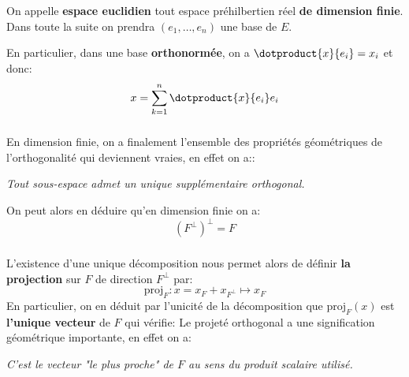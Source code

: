 \chapter*{}
On appelle \textbf{espace euclidien} tout espace préhilbertien réel \textbf{de dimension finie}. Dans toute la suite on prendra \((e_1, \ldots, e_n)\) une base de \(E\).

En particulier, dans une base \textbf{orthonormée}, on a \(\dotproduct{x}{e_i} = x_i\) et donc:
\[
   x = \sum_{k=1}^{n} \dotproduct{x}{e_i}e_i 
\]
\subsection*{}
En dimension finie, on a finalement l'ensemble des propriétés géométriques de l'orthogonalité qui deviennent vraies, en effet on a::
\begin{center}
   \textit{Tout sous-espace admet un unique supplémentaire orthogonal.}
\end{center}
On peut alors en déduire qu'en dimension finie on a:
\[
   (F^\perp)^\perp = F   
\]
\subsection*{}
L'existence d'une unique décomposition nous permet alors de définir \textbf{la projection} sur \(F\) de direction \(F^\perp\) par:
\[
   \text{proj}_F : x = x_F + x_{F^\perp} \mapsto x_F   
\]
En particulier, on en déduit par l'unicité de la décomposition que \(\text{proj}_F(x)\) est \textbf{l'unique vecteur} de \(F\) qui vérifie:
Le projeté orthogonal a une signification géométrique importante, en effet on a:
\begin{center}
   \textit{C'est le vecteur "le plus proche" de \(F\) au sens du produit scalaire utilisé.}
\end{center}
\pagebreak
